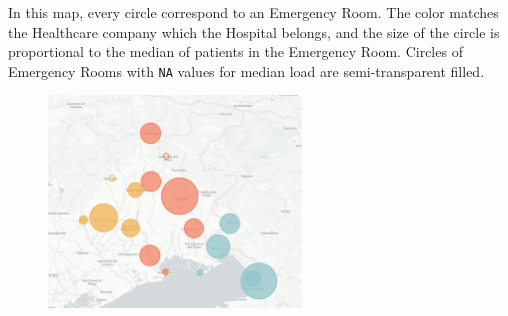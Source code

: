 \documentclass[8pt,english,aspectratio=169]{beamer}
\begin{document}
\begin{frame}
In this map, every circle correspond to an Emergency Room. The color matches the Healthcare company which the Hospital belongs, and the size of the circle is proportional to the median of patients in the Emergency Room. Circles of Emergency Rooms with \texttt{NA} values for median load are semi-transparent filled.
\begin{figure}
  \centering
  \href{http://uniud.enricostefanel.it/datascience/project/images/map.html}{\includegraphics[width=0.6\textwidth]{../images/map.pdf}}
\end{figure}

\end{frame}
\end{document}
